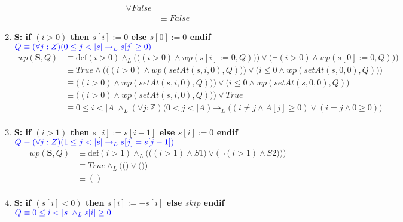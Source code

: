 \documentclass{article}
\begin{document}
\begin{enumerate}[label=\alph*)]
\begin{align*}
   								\vee False\\
   							&\equiv False
   		\end{align*}
	\item
		\textbf{S: if $(i>0)$ then $s[i] := 0$ else $s[0] := 0$ endif}\\
   		\hspace*{24mm}$\color{blue}Q \equiv (\forall j :Z)(0 \leq j < |s| 
   			\rightarrow_L s[j] \geq 0)$\\
   		\begin{align*}
   			wp(\textbf{S},Q)&\equiv \textrm{def}(i>0)\wedge_L 
   				\Bigg(\Big((i>0)\wedge wp(s[i] := 0,Q))\Big) \vee\Big(\neg (i>0)\wedge wp(s[0] := 0,Q)\Big)\Bigg)\\
   					&\equiv True \wedge \Bigg(\Big((i>0)\wedge wp(setAt(s,i,0),Q))\Big) 
   						\vee\Big(i\leq0\wedge wp(setAt(s,0,0),Q)\Big)\Bigg)\\ 
   				&\equiv \Big((i>0)\wedge wp(setAt(s,i,0),Q))\Big) 
   						\vee\Big(i\leq0\wedge wp(setAt(s,0,0),Q)\Big)\\ 
   				&\equiv \Big((i>0)\wedge wp(setAt(s,i,0),Q))\Big) 
   						\vee True\\ 
   				&\equiv 0\leq i<|A| \wedge_L (\forall j :\mathbb{Z})
				\Big(0 < j < |A|\Big) \rightarrow_L  
				\Big((i\neq j \wedge A[j] \geq 0)\vee(i=j\wedge 0\geq 0)\Big)\\			   				  				
   		\end{align*}
	\item
		\textbf{S: if $(i>1)$ then $s[i] := s[i-1]$ else $s[i] := 0$ endif}\\
   		\hspace*{24mm}$\color{blue}Q \equiv (\forall j :Z)(1 \leq j < |s| 
   			\rightarrow_L s[j] = s[j - 1])$\\
   		\begin{align*}
   			wp(\textbf{S},Q)&\equiv \textrm{def}(i>1)\wedge_L 
   				\Bigg(\Big((i>1)\wedge S1\Big) \vee\Big(\neg (i>1)\wedge S2)\Big)\Bigg)\\
   							&\equiv True \wedge_L\Bigg(\Big(\Big) \vee \Big(\Big)\Bigg)\\
   							&\equiv () \\
   		\end{align*}
	\item
		\textbf{S: if $(s[i]<0)$ then $s[i] := -s[i]$ else $skip$ endif}\\
   		\hspace*{24mm}$\color{blue}Q \equiv 0 \leq i < |s| \wedge_L s[i] \geq 0$\\

\end{enumerate}
\end{document}
